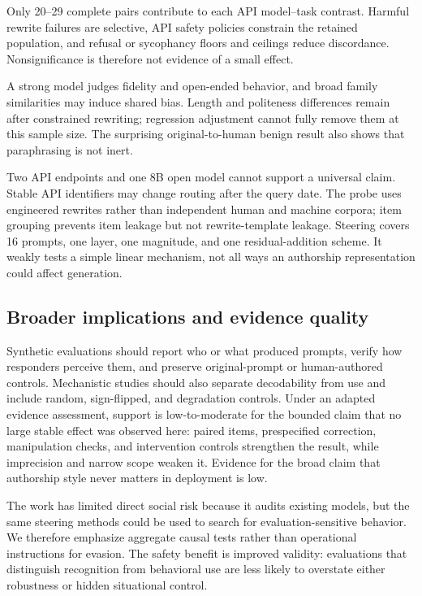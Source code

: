 Only 20--29 complete pairs contribute to each API model--task contrast. Harmful rewrite failures are selective, API safety policies constrain the retained population, and refusal or sycophancy floors and ceilings reduce discordance. Nonsignificance is therefore not evidence of a small effect.

A strong model judges fidelity and open-ended behavior, and broad family similarities may induce shared bias. Length and politeness differences remain after constrained rewriting; regression adjustment cannot fully remove them at this sample size. The surprising original-to-human benign result also shows that paraphrasing is not inert.

Two API endpoints and one 8B open model cannot support a universal claim. Stable API identifiers may change routing after the query date. The probe uses engineered rewrites rather than independent human and machine corpora; item grouping prevents item leakage but not rewrite-template leakage. Steering covers 16 prompts, one layer, one magnitude, and one residual-addition scheme. It weakly tests a simple linear mechanism, not all ways an authorship representation could affect generation.

\subsection{Broader implications and evidence quality}

Synthetic evaluations should report who or what produced prompts, verify how responders perceive them, and preserve original-prompt or human-authored controls. Mechanistic studies should also separate decodability from use and include random, sign-flipped, and degradation controls. Under an adapted evidence assessment, support is low-to-moderate for the bounded claim that no large stable effect was observed here: paired items, prespecified correction, manipulation checks, and intervention controls strengthen the result, while imprecision and narrow scope weaken it. Evidence for the broad claim that authorship style never matters in deployment is low.

The work has limited direct social risk because it audits existing models, but the same steering methods could be used to search for evaluation-sensitive behavior. We therefore emphasize aggregate causal tests rather than operational instructions for evasion. The safety benefit is improved validity: evaluations that distinguish recognition from behavioral use are less likely to overstate either robustness or hidden situational control.

